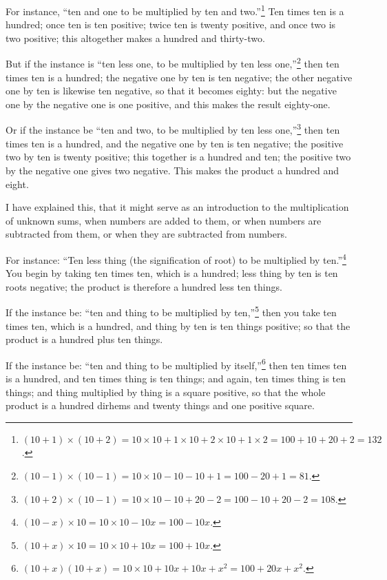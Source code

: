 For instance, ``ten and one to be multiplied by ten and two.''\footnote{$(10 + 1) \times (10 + 2) = 10 \times 10 + 1 \times 10 + 2 \times 10 + 1 \times 2 = 100 + 10 + 20 + 2 = 132$.} Ten times ten is a hundred; once ten is ten positive; twice ten is twenty positive, and once two is two positive; this altogether makes a hundred and thirty-two.

But if the instance is ``ten less one, to be multiplied by ten less one,''\footnote{$(10 - 1) \times (10 - 1) = 10 \times 10 - 10 - 10 + 1 = 100 - 20 + 1 = 81$.} then ten times ten is a hundred; the negative one by ten is ten negative; the other negative one by ten is likewise ten negative, so that it becomes eighty: but the negative one by the negative one is one positive, and this makes the result eighty-one.

Or if the instance be ``ten and two, to be multiplied by ten less one,''\footnote{$(10 + 2) \times (10 - 1) = 10 \times 10 - 10 + 20 - 2 = 100 - 10 + 20 - 2 = 108$.} then ten times ten is a hundred, and the negative one by ten is ten negative; the positive two by ten is twenty positive; this together is a hundred and ten; the positive two by the negative one gives two negative. This makes the product a hundred and eight.

I have explained this, that it might serve as an introduction to the multiplication of unknown sums, when numbers are added to them, or when numbers are subtracted from them, or when they are subtracted from numbers.

For instance: ``Ten less thing (the signification of root) to be multiplied by ten.''\footnote{$(10 - x) \times 10 = 10 \times 10 - 10x = 100 - 10x$.} You begin by taking ten times ten, which is a hundred; less thing by ten is ten roots negative; the product is therefore a hundred less ten things.

If the instance be: ``ten and thing to be multiplied by ten,''\footnote{$(10 + x) \times 10 = 10 \times 10 + 10x = 100 + 10x$.} then you take ten times ten, which is a hundred, and thing by ten is ten things positive; so that the product is a hundred plus ten things.

If the instance be: ``ten and thing to be multiplied by itself,''\footnote{$(10 + x)(10 + x) = 10 \times 10 + 10x + 10x + x^2 = 100 + 20x + x^2$.} then ten times ten is a hundred, and ten times thing is ten things; and again, ten times thing is ten things; and thing multiplied by thing is a square positive, so that the whole product is a hundred dirhems and twenty things and one positive square.


